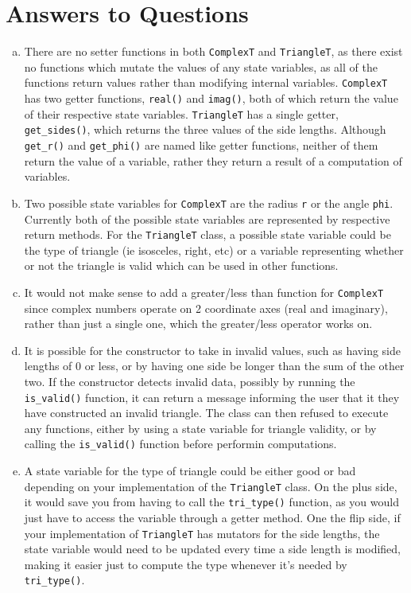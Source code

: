 \documentclass[12pt]{article}
\begin{document}
\section{Answers to Questions}

\begin{enumerate}[(a)]

\item There are no setter functions in both \verb|ComplexT| and \verb|TriangleT|, as there exist no functions which mutate the values of any state variables, as all of the functions return values rather than modifying internal variables. \verb|ComplexT| has two getter functions, \verb|real()| and \verb|imag()|, both of which return the value of their respective state variables. \verb|TriangleT| has a single getter, \verb|get_sides()|, which returns the three values of the side lengths. Although \verb|get_r()| and \verb|get_phi()| are named like getter functions, neither of them return the value of a variable, rather they return a result of a computation of variables. 
\item Two possible state variables for \verb|ComplexT| are the radius \verb|r| or the angle \verb|phi|. Currently both of the possible state variables are represented by respective return methods. For the \verb|TriangleT| class, a possible state variable could be the type of triangle (ie isosceles, right, etc) or a variable representing whether or not the triangle is valid which can be used in other functions. 
\item It would not make sense to add a greater/less than function for \verb|ComplexT| since complex numbers operate on 2 coordinate axes (real and imaginary), rather than just a single one, which the greater/less operator works on. 
\item It is possible for the constructor to take in invalid values, such as having side lengths of 0 or less, or by having one side be longer than the sum of the other two. If the constructor detects invalid data, possibly by running the \verb|is_valid()| function, it can return a message informing the user that it they have constructed an invalid triangle. The class can then refused to execute any functions, either by using a state variable for triangle validity, or by calling the \verb|is_valid()| function before performin computations.
\item A state variable for the type of triangle could be either good or bad depending on your implementation of the \verb|TriangleT| class. On the plus side, it would save you from having to call the \verb|tri_type()| function, as you would just have to access the variable through a getter method. One the flip side, if your implementation of \verb|TriangleT| has mutators for the side lengths, the state variable would need to be updated every time a side length is modified, making it easier just to compute the type whenever it's needed by \verb|tri_type()|.	

\end{enumerate}
\end{document}

